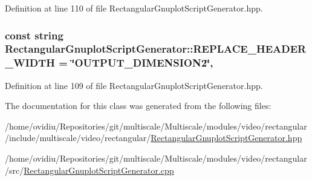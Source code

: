 Definition at line 110 of file Rectangular\-Gnuplot\-Script\-Generator.\-hpp.

\hypertarget{classmultiscale_1_1video_1_1RectangularGnuplotScriptGenerator_a2b9a87b266a126d6cdd6d6ee1d707b87}{
\subsubsection[{R\-E\-P\-L\-A\-C\-E\-\_\-\-H\-E\-A\-D\-E\-R\-\_\-\-W\-I\-D\-T\-H}]{\setlength{\rightskip}{0pt plus 5cm}const string Rectangular\-Gnuplot\-Script\-Generator\-::\-R\-E\-P\-L\-A\-C\-E\-\_\-\-H\-E\-A\-D\-E\-R\-\_\-\-W\-I\-D\-T\-H = \char`\"{}O\-U\-T\-P\-U\-T\-\_\-\-D\-I\-M\-E\-N\-S\-I\-O\-N2\char`\"{}\hspace{0.3cm}{\ttfamily [static]}, {\ttfamily [private]}}}\label{classmultiscale_1_1video_1_1RectangularGnuplotScriptGenerator_a2b9a87b266a126d6cdd6d6ee1d707b87}


Definition at line 109 of file Rectangular\-Gnuplot\-Script\-Generator.\-hpp.



The documentation for this class was generated from the following files\-:\begin{DoxyCompactItemize}
\item 
/home/ovidiu/\-Repositories/git/multiscale/\-Multiscale/modules/video/rectangular/include/multiscale/video/rectangular/\hyperlink{RectangularGnuplotScriptGenerator_8hpp}{Rectangular\-Gnuplot\-Script\-Generator.\-hpp}\item 
/home/ovidiu/\-Repositories/git/multiscale/\-Multiscale/modules/video/rectangular/src/\hyperlink{RectangularGnuplotScriptGenerator_8cpp}{Rectangular\-Gnuplot\-Script\-Generator.\-cpp}\end{DoxyCompactItemize}
